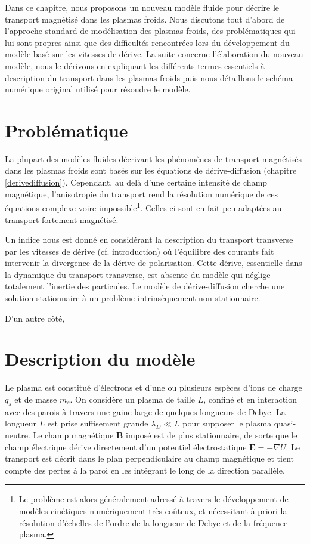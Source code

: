 Dans ce chapitre, nous proposons un nouveau modèle fluide pour décrire le
transport magnétisé dans les plasmas froids. Nous discutons tout d'abord de
l'approche standard de modélisation des plasmas froids, des problématiques qui
lui sont propres ainsi que des difficultés rencontrées lors du développement du
modèle basé sur les vitesses de dérive. La suite concerne l'élaboration du
nouveau modèle, nous le dérivons en expliquant les différents
termes essentiels à description du transport dans les plasmas froids puis nous
détaillons le schéma numérique original utilisé pour résoudre le modèle.
\section{Problématique}
La plupart des modèles fluides décrivant les phénomènes de transport
magnétisés dans les plasmas froids sont basés sur les équations de
dérive-diffusion (chapitre \ref{derivediffusion}). Cependant, au delà d'une
certaine intensité de champ magnétique, l'anisotropie du transport rend la résolution
numérique de ces équations complexe voire impossible\footnote{Le problème est alors
généralement adressé à travers le développement de
modèles cinétiques numériquement très coûteux, et nécessitant à priori la
résolution d'échelles de l'ordre de la longueur de Debye et de la fréquence plasma.}. 
Celles-ci sont en fait peu adaptées au transport fortement magnétisé. 


Un indice nous est donné en considérant la
description du transport transverse par les vitesses de dérive (cf.
introduction) où l'équilibre des courants fait intervenir la divergence de
la dérive de polarisation. Cette dérive, essentielle dans la dynamique du transport 
transverse, est absente du modèle qui néglige totalement l'inertie des particules. Le modèle de
dérive-diffusion cherche une solution stationnaire à un problème intrinsèquement non-stationnaire.

D'un autre côté, 

\section{Description du modèle}
Le plasma est constitué d'électrons et d'une ou plusieurs espèces d'ions
de charge $q_s$ et de masse $m_s$. On considère un plasma de taille $L$, 
confiné et en interaction avec des parois à travers une gaine
large de quelques longueurs de Debye. La longueur $L$ est prise suffisement 
grande $\lambda_D\ll L$ pour supposer le plasma quasi-neutre. Le champ magnétique $\mathbf{B}$ imposé
est de plus stationnaire, de sorte que le champ électrique dérive directement d'un potentiel électrostatique
$\mathbf{E}=-\nabla U$. Le transport est décrit dans le plan perpendiculaire au champ magnétique et tient compte
des pertes à la paroi en les intégrant le long de la direction parallèle. 
